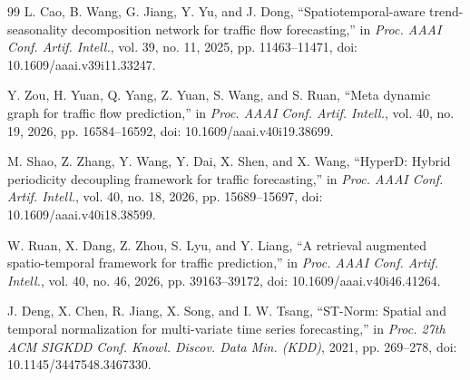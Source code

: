 \begin{thebibliography}{99}
L. Cao, B. Wang, G. Jiang, Y. Yu, and J. Dong,
``Spatiotemporal-aware trend-seasonality decomposition network for traffic flow forecasting,''
in \emph{Proc. AAAI Conf. Artif. Intell.},
vol. 39, no. 11, 2025, pp. 11463--11471,
doi: 10.1609/aaai.v39i11.33247.

Y. Zou, H. Yuan, Q. Yang, Z. Yuan, S. Wang, and S. Ruan,
``Meta dynamic graph for traffic flow prediction,''
in \emph{Proc. AAAI Conf. Artif. Intell.},
vol. 40, no. 19, 2026, pp. 16584--16592,
doi: 10.1609/aaai.v40i19.38699.

M. Shao, Z. Zhang, Y. Wang, Y. Dai, X. Shen, and X. Wang,
``HyperD: Hybrid periodicity decoupling framework for traffic forecasting,''
in \emph{Proc. AAAI Conf. Artif. Intell.},
vol. 40, no. 18, 2026, pp. 15689--15697,
doi: 10.1609/aaai.v40i18.38599.

W. Ruan, X. Dang, Z. Zhou, S. Lyu, and Y. Liang,
``A retrieval augmented spatio-temporal framework for traffic prediction,''
in \emph{Proc. AAAI Conf. Artif. Intell.},
vol. 40, no. 46, 2026, pp. 39163--39172,
doi: 10.1609/aaai.v40i46.41264.

J. Deng, X. Chen, R. Jiang, X. Song, and I. W. Tsang,
``ST-Norm: Spatial and temporal normalization for multi-variate time series forecasting,''
in \emph{Proc. 27th ACM SIGKDD Conf. Knowl. Discov. Data Min. (KDD)},
2021, pp. 269--278, doi: 10.1145/3447548.3467330.

\end{thebibliography}
\endgroup
